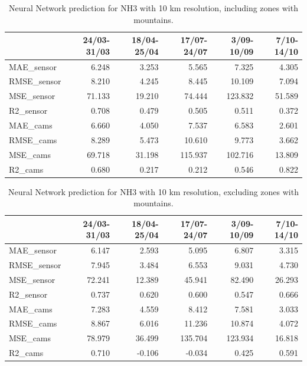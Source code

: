 \begin{table}[H]
\begin{tabular}{lrrrrr}
\toprule
  &  24/03-31/03 &  18/04-25/04 &  17/07-24/07 &  3/09-10/09 &  7/10-14/10 \\
\midrule
 MAE\_sensor &        6.248 &        3.253 &        5.565 &       7.325 &       4.305 \\
RMSE\_sensor &        8.210 &        4.245 &        8.445 &      10.109 &       7.094 \\
 MSE\_sensor &       71.133 &       19.210 &       74.444 &     123.832 &      51.589 \\
  R2\_sensor &        0.708 &        0.479 &        0.505 &       0.511 &       0.372 \\
   MAE\_cams &        6.660 &        4.050 &        7.537 &       6.583 &       2.601 \\
  RMSE\_cams &        8.289 &        5.473 &       10.610 &       9.773 &       3.662 \\
   MSE\_cams &       69.718 &       31.198 &      115.937 &     102.716 &      13.809 \\
    R2\_cams &        0.680 &        0.217 &        0.212 &       0.546 &       0.822 \\
\bottomrule
\end{tabular}
\caption{Neural Network prediction for NH3 with 10 km resolution, including zones with mountains.}
\end{table}

\begin{table}[H]
\begin{tabular}{lrrrrr}
\toprule
  &  24/03-31/03 &  18/04-25/04 &  17/07-24/07 &  3/09-10/09 &  7/10-14/10 \\
\midrule
 MAE\_sensor &        6.147 &        2.593 &        5.095 &       6.807 &       3.315 \\
RMSE\_sensor &        7.945 &        3.484 &        6.553 &       9.031 &       4.730 \\
 MSE\_sensor &       72.241 &       12.389 &       45.941 &      82.490 &      26.293 \\
  R2\_sensor &        0.737 &        0.620 &        0.600 &       0.547 &       0.666 \\
   MAE\_cams &        7.283 &        4.559 &        8.412 &       7.581 &       3.033 \\
  RMSE\_cams &        8.867 &        6.016 &       11.236 &      10.874 &       4.072 \\
   MSE\_cams &       78.979 &       36.499 &      135.704 &     123.934 &      16.818 \\
    R2\_cams &        0.710 &       -0.106 &       -0.034 &       0.425 &       0.591 \\
\bottomrule
\end{tabular}
\caption{Neural Network prediction for NH3 with 10 km resolution, excluding zones with mountains.}
\end{table}

